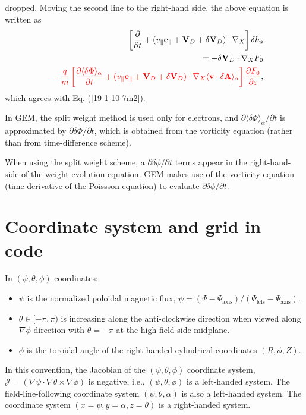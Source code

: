 \documentclass{llncs}
\newcommand{\tmcolor}[2]{{\color{#1}{#2}}}
\newcommand{\tmop}[1]{\ensuremath{\operatorname{#1}}}
\newcommand{\tmtexttt}[1]{\text{{\ttfamily{#1}}}}
\begin{document}
dropped. Moving the second line to the right-hand side, the above equation is
written as
\begin{eqnarray}
  &  & \left[ \frac{\partial}{\partial t} + (v_{\parallel}
  \mathbf{e}_{\parallel} +\mathbf{V}_D + \delta \mathbf{V}_D) \cdot \nabla_X
  \right] \delta h_s \nonumber\\
  &  & = - \delta \mathbf{V}_D \cdot \nabla_X F_0 \nonumber\\
  &  & \tmcolor{red}{- \frac{q}{m}  \left[ \frac{\partial \langle \delta \Phi
  \rangle_{\alpha}}{\partial t} + (v_{\parallel} \mathbf{e}_{\parallel}
  +\mathbf{V}_D + \delta \mathbf{V}_D) \cdot \nabla_X \langle \mathbf{v} \cdot
  \delta \mathbf{A} \rangle_{\alpha} \right] \frac{\partial F_0}{\partial
  \varepsilon}},  \label{19-1-10-e2}
\end{eqnarray}
which agrees with Eq. (\ref{19-1-10-7m2}).

In GEM, the split weight method is used only for electrons, and $\partial
\langle \delta \Phi \rangle_{\alpha} / \partial t$ is approximated by
$\partial \delta \Phi / \partial t$, which is obtained from the vorticity
equation (rather than from time-difference scheme).

When using the split weight scheme, a $\partial \delta \phi / \partial t$
terms appear in the right-hand-side of the weight evolution equation. GEM
makes use of the vorticity equation (time derivative of the Poissson equation)
to evaluate $\partial \delta \phi / \partial t$.

\section{Coordinate system and grid in \tmtexttt{TEK} code}

In $(\psi, \theta, \phi)$ coordinates:
\begin{itemize}
  \item $\psi$ is the normalized poloidal magnetic flux, $\psi = (\Psi -
  \Psi_{\tmop{axis}}) / (\Psi_{\tmop{lcfs}} - \Psi_{\tmop{axis}})$.
  
  \item $\theta \in [- \pi, \pi)$ is increasing along the anti-clockwise
  direction when viewed along $\nabla \phi$ direction with $\theta = - \pi$ at
  the high-field-side midplane.
  
  \item $\phi$ is the toroidal angle of the right-handed cylindrical
  coordinates $(R, \phi, Z)$.
\end{itemize}
In this convention, the Jacobian of the $(\psi, \theta, \phi)$ coordinate
system, $\mathcal{J} = (\nabla \psi \cdot \nabla \theta \times \nabla \phi)$
is negative, i.e., $(\psi, \theta, \phi)$ is a left-handed system. The
field-line-following coordinate system $(\psi, \theta, \alpha)$ is also a
left-handed system. The coordinate system $(x = \psi, y = \alpha, z = \theta)$
is a right-handed system.
\end{document}
